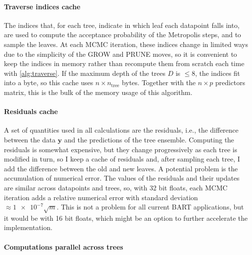 \documentclass{article}
\begin{document}
    \paragraph{Traverse indices cache}

    The indices that, for each tree, indicate in which leaf each datapoint falls into, are used to compute the acceptance probability of the Metropolis steps, and to sample the leaves. At each MCMC iteration, these indices change in limited ways due to the simplicity of the GROW and PRUNE moves, so it is convenient to keep the indices in memory rather than recompute them from scratch each time with \autoref{alg:traverse}. If the maximum depth of the trees $D$ is $\le 8$, the indices fit into a byte, so this cache uses $n \times n_\text{tree}$ bytes. Together with the $n\times p$ predictors matrix, this is the bulk of the memory usage of this algorithm.

    \paragraph{Residuals cache}

    A set of quantities used in all calculations are the residuals, i.e., the difference between the data $\mathbf y$ and the predictions of the tree ensemble. Computing the residuals is somewhat expensive, but they change progressively as each tree is modified in turn, so I keep a cache of residuals and, after sampling each tree, I add the difference between the old and new leaves. A potential problem is the accumulation of numerical error. The values of the residuals and their updates are similar across datapoints and trees, so, with 32 bit floats, each MCMC iteration adds a relative numerical error with standard deviation $\approx \num{1e-7} \sqrt m$. This is not a problem for all current BART applications, but it would be with 16 bit floats, which might be an option to further accelerate the implementation.

    \paragraph{Computations parallel across trees}
\end{document}
